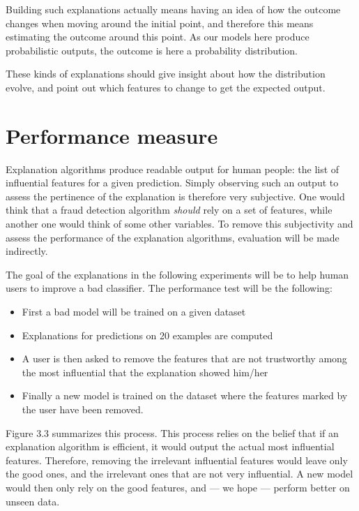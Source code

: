 \documentclass[a4paper,11pt]{kth-mag}
\begin{document}
Building such explanations actually means having an idea of how the outcome changes when moving around the initial point, and therefore this means estimating the outcome around this point. As our models here produce probabilistic outputs, the outcome is here a probability distribution.

These kinds of explanations should give insight about how the distribution evolve, and point out which features to change to get the expected output.


\section{Performance measure}

Explanation algorithms produce readable output for human people: the list of influential features for a given prediction. Simply observing such an output to assess the pertinence of the explanation is therefore very subjective. One would think that a fraud detection algorithm \textit{should} rely on a set of features, while another one would think of some other variables. To remove this subjectivity and assess the performance of the explanation algorithms, evaluation will be made indirectly.

The goal of the explanations in the following experiments will be to help human users to improve a bad classifier. The performance test will be the following: 

\begin{itemize}
	\item First a bad model will be trained on a given dataset
	\item Explanations for predictions on 20 examples are computed
	\item A user is then asked to remove the features that are not trustworthy among the most influential that the explanation showed him/her
	\item Finally a new model is trained on the dataset where the features marked by the user have been removed.
\end{itemize}

Figure 3.3 summarizes this process. This process relies on the belief that if an explanation algorithm is efficient, it would output the actual most influential features. Therefore, removing the irrelevant influential features would leave only the good ones, and the irrelevant ones that are not very influential. A new model would then only rely on the good features, and --- we hope --- perform better on unseen data.
\end{document}
